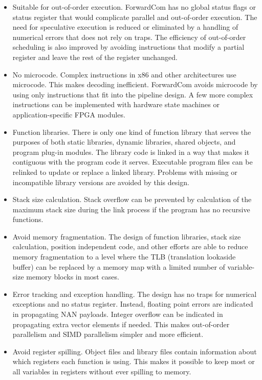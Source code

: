 \documentclass[forwardcom.tex]{subfiles}
\begin{document}
\begin{itemize}
\item Suitable for out-of-order execution. ForwardCom has no global status flags or status register that would complicate parallel and out-of-order execution. The need for speculative execution is reduced or eliminated by a handling of numerical errors that does not rely on traps. 
The efficiency of out-of-order scheduling is also improved by avoiding instructions that modify a partial register and leave the rest of the register unchanged.

\item No microcode. Complex instructions in x86 and other architectures use microcode. This makes decoding inefficient. ForwardCom avoids microcode by using only instructions that fit into the pipeline design. A few more complex instructions can be implemented with hardware state machines or application-specific FPGA modules.

\item Function libraries. There is only one kind of function library that serves the purposes of both static libraries, dynamic libraries, shared objects, and program plug-in modules. The library code is linked in a way that makes it contiguous with the program code it serves. Executable program files can be relinked to update or replace a linked library. Problems with missing or incompatible library versions are avoided by this design.

\item Stack size calculation. Stack overflow can be prevented by calculation of the maximum stack size during the link process if the program has no recursive functions.

\item Avoid memory fragmentation. The design of function libraries, stack size calculation, position independent code, and other efforts are able to reduce memory fragmentation to a level where the TLB (translation lookaside buffer) can be replaced by a memory map with a limited number of variable-size memory blocks in most cases.

\item Error tracking and exception handling. The design has no traps for numerical exceptions and no status register. Instead, floating point errors are indicated in propagating NAN payloads. Integer overflow can be indicated in propagating extra vector elements if needed. This makes out-of-order parallelism and SIMD parallelism simpler and more efficient.

\item Avoid register spilling. Object files and library files contain information about which registers each function is using. This makes it possible to keep most or all variables in registers without ever spilling to memory.


\end{itemize}
\end{document}
